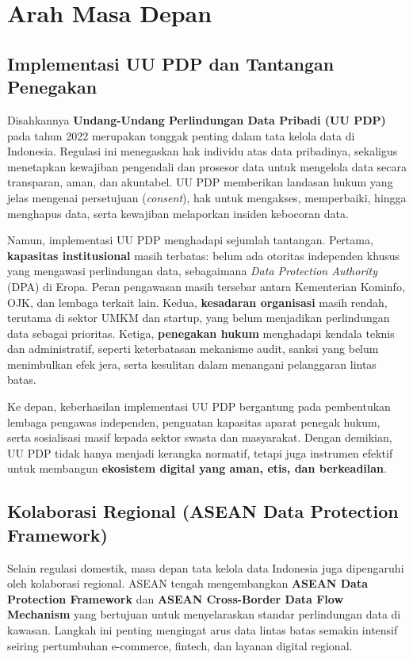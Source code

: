 \section{Arah Masa Depan}

\subsection{Implementasi UU PDP dan Tantangan Penegakan}

Disahkannya \textbf{Undang-Undang Perlindungan Data Pribadi (UU PDP)} pada tahun 2022 merupakan tonggak penting dalam tata kelola data di Indonesia. Regulasi ini menegaskan hak individu atas data pribadinya, sekaligus menetapkan kewajiban pengendali dan prosesor data untuk mengelola data secara transparan, aman, dan akuntabel. UU PDP memberikan landasan hukum yang jelas mengenai persetujuan (\textit{consent}), hak untuk mengakses, memperbaiki, hingga menghapus data, serta kewajiban melaporkan insiden kebocoran data.  

Namun, implementasi UU PDP menghadapi sejumlah tantangan. Pertama, \textbf{kapasitas institusional} masih terbatas: belum ada otoritas independen khusus yang mengawasi perlindungan data, sebagaimana \textit{Data Protection Authority} (DPA) di Eropa. Peran pengawasan masih tersebar antara Kementerian Kominfo, OJK, dan lembaga terkait lain. Kedua, \textbf{kesadaran organisasi} masih rendah, terutama di sektor UMKM dan startup, yang belum menjadikan perlindungan data sebagai prioritas. Ketiga, \textbf{penegakan hukum} menghadapi kendala teknis dan administratif, seperti keterbatasan mekanisme audit, sanksi yang belum menimbulkan efek jera, serta kesulitan dalam menangani pelanggaran lintas batas.  

Ke depan, keberhasilan implementasi UU PDP bergantung pada pembentukan lembaga pengawas independen, penguatan kapasitas aparat penegak hukum, serta sosialisasi masif kepada sektor swasta dan masyarakat. Dengan demikian, UU PDP tidak hanya menjadi kerangka normatif, tetapi juga instrumen efektif untuk membangun \textbf{ekosistem digital yang aman, etis, dan berkeadilan}.

\subsection{Kolaborasi Regional (ASEAN Data Protection Framework)}

Selain regulasi domestik, masa depan tata kelola data Indonesia juga dipengaruhi oleh kolaborasi regional. ASEAN tengah mengembangkan \textbf{ASEAN Data Protection Framework} dan \textbf{ASEAN Cross-Border Data Flow Mechanism} yang bertujuan untuk menyelaraskan standar perlindungan data di kawasan. Langkah ini penting mengingat arus data lintas batas semakin intensif seiring pertumbuhan e-commerce, fintech, dan layanan digital regional.  

